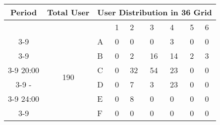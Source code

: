 \begin{table*}[hpt]
\begin{minipage}{.5\linewidth}
\begin{tabular}{|c|c|p{0.4cm}|p{0.4cm}|p{0.4cm}|p{0.4cm}|p{0.4cm}|p{0.4cm}|p{0.4cm}|}
\hline	
\end{tabular}	
\vspace*{0.1in} \\	
\begin{tabular}{|c|c|p{0.4cm}|p{0.4cm}|p{0.4cm}|p{0.4cm}|p{0.4cm}|p{0.4cm}|p{0.4cm}|}	
\hline	
Period & Total User &\multicolumn{7}{c|}{User Distribution in 36 Grid} \\	
\hline	
&& & 1 &2 & 3 & 4 & 5&6\\	
\cline{3-9}	
 & \multirow{7}{*}{190}	
 &A	
& 0& 0& 0& 3& 0& 0  \\	
\cline{3-9}	
 && B	
& 0& 2& 16& 14& 2& 3  \\	
\cline{3-9}	
20:00 && C	
& 0& 32& 54& 23& 0& 0  \\	
\cline{3-9}	
 -&& D 	
& 0& 7& 3& 23& 0& 0  \\	
\cline{3-9}	
24:00 && E 	
& 0& 8& 0& 0& 0& 0  \\	
\cline{3-9}	
 && F 	
& 0& 0& 0& 0& 0& 0  \\	
\hline	
\end{tabular}	
\vspace*{0.1in} \\	
\end{minipage}	
\label{table:austin_cluster}	
\caption{User Distribution in Districts of Austin}	
\end{table*}	
